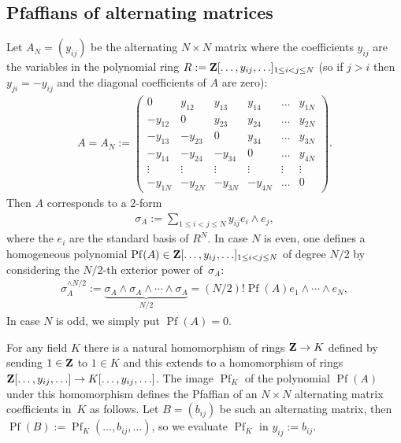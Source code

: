 \documentclass[10pt,a4paper]{amsart}
\newcommand{\ZZ}{{\bf Z}}
\numberwithin{equation}{section}
\begin{document}
\subsection{Pfaffians of alternating matrices} \label{Pfaff}
Let $A_N=(y_{ij})$ be the alternating $N\times N$ matrix where the coefficients $y_{ij}$ are the variables in the polynomial ring $R:=\ZZ[\ldots,y_{ij},\ldots]_{1\leq i<j\leq N}$
(so if $j>i$ then $y_{ji}=-y_{ij}$ and the diagonal coefficients of $A$ are zero):
\begin{gather*}
A = A_N :=\left(\begin{matrix}
0&y_{12}&y_{13}&y_{14}&\ldots&y_{1N}\\
-y_{12}&0&y_{23}&y_{24}&\ldots&y_{2N}\\
-y_{13}&-y_{23}&0&y_{34}&\ldots&y_{3N}\\
-y_{14}&-y_{24}&-y_{34}&0&\ldots&y_{4N}\\
\vdots&\vdots&\vdots&\vdots&\vdots&\vdots\\
-y_{1N}&-y_{2N}&-y_{3N}&-y_{4N}&\ldots&0
\end{matrix}\right).
\end{gather*}
Then $A$ corresponds to a $2$-form
\begin{gather*}
\sigma_A := \sum_{1\leq i<j\leq N} y_{ij}e_i\wedge e_j,
\end{gather*}
where the $e_i$ are the standard basis of $R^N$. In case $N$ is even, one defines a homogeneous polynomial $\operatorname{Pf}(A) \in \ZZ[\ldots,y_{ij},\ldots]_{1\leq i<j\leq N}$ of degree $N/2$ by considering the $N/2$-th exterior power of~$\sigma_A$:
\begin{gather*}
\sigma_A^{\wedge N/2} := \underbrace{\sigma_A\wedge\sigma_A\wedge \cdots\wedge\sigma_A}_{N/2} = {(N/2)!}\operatorname{Pf}(A)e_1\wedge\cdots\wedge e_N,
\end{gather*}
In case $N$ is odd, we simply put $\operatorname{Pf}(A)=0$.

For any field $K$ there is a natural homomorphism of rings $\ZZ\rightarrow K$ defined by sending $1\in\ZZ$ to $1\in K$ and this extends to a homomorphism of rings $\ZZ[\ldots,y_{ij},\ldots]\rightarrow K[\ldots,y_{ij},\ldots]$. The image $\operatorname{Pf}_K$ of the polynomial $\operatorname{Pf}(A)$ under this homomorphism defines the Pfaffian of an $N\times N$ alternating matrix coefficients in~$K$ as follows. Let $B=(b_{ij})$ be such an alternating matrix, then $\operatorname{Pf}(B):=\operatorname{Pf}_K(\ldots,b_{ij},\ldots)$, so we
evaluate $\operatorname{Pf}_K$ in $y_{ij}:=b_{ij}$.
\end{document}
